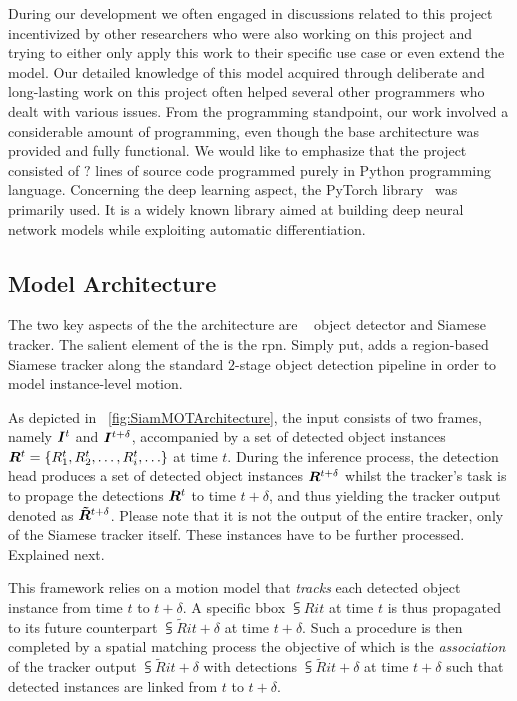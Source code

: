 During our development we often engaged in discussions related to this project incentivized by other researchers who were also working on this project and trying to either only apply this work to their specific use case or even extend the model. Our detailed knowledge of this model acquired through deliberate and long-lasting work on this project often helped several other programmers who dealt with various issues. From the programming standpoint, our work involved a considerable amount of programming, even though the base architecture was provided and fully functional. We would like to emphasize that the project consisted of $?$ lines of source code programmed purely in Python programming language. Concerning the deep learning aspect, the PyTorch library~\cite{paszke2019pytorch} was primarily used. It is a widely known library aimed at building deep neural network models while exploiting automatic differentiation.

\subsection{Model Architecture}

The two key aspects of the the \siammot{} architecture are \fasterrcnn{}~\cite{ren2017fasterrcnn} object detector and Siamese tracker. The salient element of the \fasterrcnn{} is the \gls{rpn}. Simply put, \siammot{} adds a region-based Siamese tracker along the standard $2$-stage object detection pipeline in order to model instance-level motion.

As depicted in \figtext{}~\ref{fig:SiamMOTArchitecture}, the input consists of two frames, namely $\bm{I}^{t}$ and $\bm{I}^{t + \delta}$, accompanied by a set of detected object instances $\bm{R}^{t} = \left\{ {{R}_{1}^{t}, {R}_{2}^{t}, \dots, {R}_{i}^{t}, \dots} \right\}$ at time $t$. During the inference process, the detection head produces a set of detected object instances $\bm{R}^{t + \delta}$ whilst the tracker's task is to propage the detections $\bm{R}^{t}$ to time $t + \delta$, and thus yielding the tracker output denoted as $\bm{\tilde{R}}^{t + \delta}$. Please note that it is not the output of the entire tracker, only of the Siamese tracker itself. These instances have to be further processed. Explained next.

This framework relies on a motion model that \emph{tracks} each detected object instance from time $t$ to $t + \delta$. A specific \gls{bbox} $\subsup{R}{i}{t}$ at time $t$ is thus propagated to its future counterpart $\subsup{\tilde{R}}{i}{t + \delta}$ at time $t + \delta$. Such a procedure is then completed by a spatial matching process the objective of which is the \emph{association} of the tracker output $\subsup{\tilde{R}}{i}{t + \delta}$ with detections $\subsup{\tilde{R}}{i}{t + \delta}$ at time $t + \delta$ such that detected instances are linked from $t$ to $t + \delta$.

